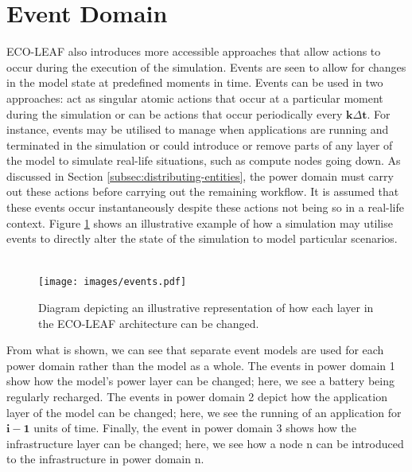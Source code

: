\documentclass{l4proj}
\begin{document}
\section{Event Domain}\label{sec:events}
ECO-LEAF also introduces more accessible approaches that allow actions to occur during the execution of the simulation.
Events are seen to allow for changes in the model state at predefined moments in time.
Events can be used in two approaches: act as singular atomic actions that occur at a particular moment during the simulation or can be actions that occur periodically every $\mathbf{k\varDelta t}$.
For instance, events may be utilised to manage when applications are running and terminated in the simulation or could introduce or remove parts of any layer of the model to simulate real-life situations, such as compute nodes going down.
As discussed in Section \ref{subsec:distributing-entities}, the power domain must carry out these actions before carrying out the remaining workflow.
It is assumed that these events occur instantaneously despite these actions not being so in a real-life context.
Figure \ref{fig:events} shows an illustrative example of how a simulation may utilise events to directly alter the state of the simulation to model particular scenarios.\\ \\
\begin{figure}[htpb]
    \centering
    \texttt{[image: images/events.pdf]}
    ~
    \caption{Diagram depicting an illustrative representation of how each layer in the ECO-LEAF architecture can be changed.}
    \label{fig:events}
\end{figure}
From what is shown, we can see that separate event models are used for each power domain rather than the model as a whole.
The events in power domain 1 show how the model's power layer can be changed; here, we see a battery being regularly recharged.
The events in power domain 2 depict how the application layer of the model can be changed; here, we see the running of an application for $\mathbf{i - 1}$ units of time.
Finally, the event in power domain 3 shows how the infrastructure layer can be changed; here, we see how a node n can be introduced to the infrastructure in power domain n.
\end{document}
